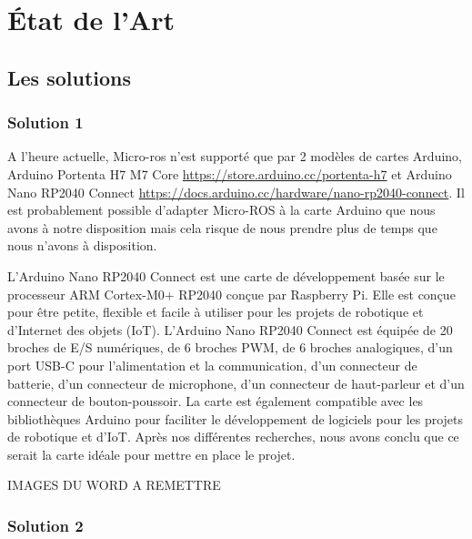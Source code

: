 	\chapter{État de l'Art}
	\thispagestyle{empty}

		\section{Les solutions}

			\subsection{Solution 1}

A l’heure actuelle, Micro-ros n’est supporté que par 2 modèles de cartes Arduino, Arduino Portenta H7 M7 Core
\url{https://store.arduino.cc/portenta-h7} et Arduino Nano RP2040 Connect \url{https://docs.arduino.cc/hardware/nano-rp2040-connect}. 
Il est probablement possible d’adapter Micro-ROS à la carte Arduino que nous avons à notre disposition mais cela risque de nous 
prendre plus de temps que nous n’avons à disposition.  
\linebreak
	
L'Arduino Nano RP2040 Connect est une carte de développement basée sur le processeur ARM Cortex-M0+ RP2040 conçue par Raspberry Pi. 
Elle est conçue pour être petite, flexible et facile à utiliser pour les projets de robotique et d'Internet des objets (IoT). 
L'Arduino Nano RP2040 Connect est équipée de 20 broches de E/S numériques, de 6 broches PWM, de 6 broches analogiques, 
d'un port USB-C pour l'alimentation et la communication, d'un connecteur de batterie, d'un connecteur de microphone, 
d'un connecteur de haut-parleur et d'un connecteur de bouton-poussoir. La carte est également compatible avec les bibliothèques Arduino 
pour faciliter le développement de logiciels pour les projets de robotique et d'IoT. 
Après nos différentes recherches, nous avons conclu que ce serait la carte idéale pour mettre en place le projet. 
\linebreak 

IMAGES DU WORD A REMETTRE

			\subsection{Solution 2}

